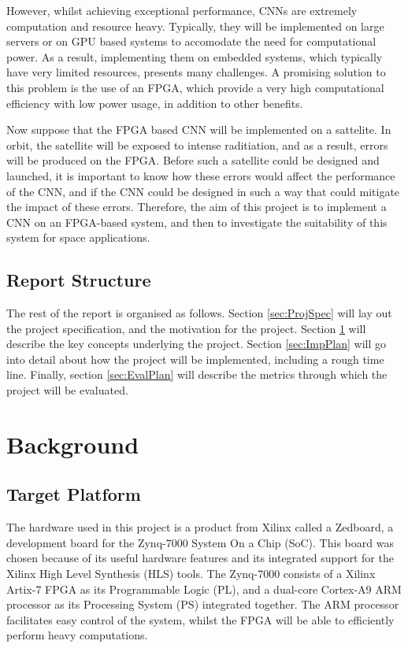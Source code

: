 \documentclass[12pt]{article}
\begin{document}
However, whilst achieving exceptional performance, CNNs are extremely computation and resource heavy. Typically, they will be implemented on large servers or on GPU based systems to accomodate the need for computational power. As a result, implementing them on embedded systems, which typically have very limited resources, presents many challenges. A promising solution to this problem is the use of an FPGA, which provide a very high computational efficiency with low power usage, in addition to other benefits.

Now suppose that the FPGA based CNN will be implemented on a sattelite. In orbit, the satellite will be exposed to intense raditiation, and as a result, errors will be produced on the FPGA. Before such a satellite could be designed and launched, it is important to know how these errors would affect the performance of the CNN, and if the CNN could be designed in such a way that could mitigate the impact of these errors. Therefore, the aim of this project is to implement a CNN on an FPGA-based system, and then to investigate the suitability of this system for space applications.

\subsection{Report Structure}
\label{sec:Intro-Structure}

The rest of the report is organised as follows. Section \ref{sec:ProjSpec} will lay out the project specification, and the motivation for the project. Section \ref{sec:Background} will describe the key concepts underlying the project. Section \ref{sec:ImpPlan} will go into detail about how the project will be implemented, including a rough time line. Finally, section \ref{sec:EvalPlan} will describe the metrics through which the project will be evaluated.

\section{Background}
\label{sec:Background}

\subsection{Target Platform}
\label{sec:Background-TargetPlatform}

The hardware used in this project is a product from Xilinx called a Zedboard, a development board for the Zynq-7000 System On a Chip (SoC). This board was chosen because of its useful hardware features and its integrated support for the Xilinx High Level Synthesis (HLS) tools. The Zynq-7000 consists of a Xilinx Artix-7 FPGA as its Programmable Logic (PL), and a dual-core Cortex-A9 ARM processor as its Processing System (PS) integrated together. The ARM processor facilitates easy control of the system, whilst the FPGA will be able to efficiently perform heavy computations.
\end{document}
